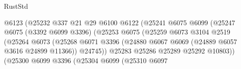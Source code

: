 \begin{lexlean}{RustStd}
\begin{coremodule}
                                                @6123
                                                (@25232
                                                  @337
                                                  @21
                                                  @29
                                                  @6100
                                                  @6122
                                                  (@25241
                                                    @6075
                                                    @6099
                                                    (@25247
                                                      @6075
                                                      (@3392 @6099 @3396)
                                                      (@25253
                                                        @6075
                                                        (@25259
                                                          @6073
                                                          @3104
                                                          @2519
                                                          (@25264
                                                            @6073
                                                            (@25268
                                                              @6071
                                                              @3396
                                                              (@24880
                                                                @6067
                                                                @6069
                                                                (@24889 @6057 @3616 @24899 @11366))
                                                              @24745))
                                                          @25283
                                                          @25286
                                                          @25289
                                                          @25292
                                                          @10803))
                                                      (@25300
                                                        @6099
                                                        @3396
                                                        (@25304
                                                          @6099
                                                          (@25310
                                                            @6097

\end{coremodule}
\end{lexlean}
